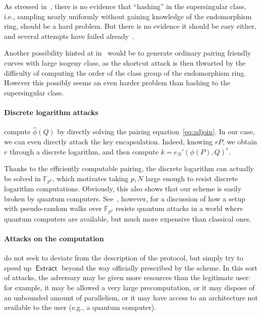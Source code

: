 \documentclass{llncs}
\newcommand{\F}{\mathbb{F}}
\DeclareMathOperator{\Extract}{\mathsf{Extract}}
\begin{document}
As stressed in~\cite{10.1007/978-3-030-34578-5_10}, there is no
evidence that ``hashing'' in the supersingular class, i.e., sampling
nearly uniformly without gaining knowledge of the endomorphism ring,
should be a hard problem. %
But there is no evidence it should be easy either, and several
attempts have failed
already~\cite{10.1007/978-3-030-45724-2_18,love2019supersingular}.

Another possibility hinted at in~\cite{10.1007/978-3-030-34578-5_10}
would be to generate ordinary pairing friendly curves with large
isogeny class, as the shortcut attack is then thwarted by the
difficulty of computing the order of the class group of the
endomorphism ring. %
However this possibly seems an even harder problem than hashing to the
supersingular class.

\paragraph{Discrete logarithm attacks} compute $\hat\phi(Q)$ by
directly solving the pairing equation~\eqref{eq:adjoin}. %
In our case, we can even directly attack the key encapsulation. %
Indeed, knowing $rP$, we obtain $r$ through a discrete logarithm, and
then compute $k=e_N'(\phi(P),Q)^r$.

Thanks to the efficiently computable pairing, the discrete logarithm
can actually be solved in $\F_{p^2}$, which motivates taking $p,N$
large enough to resist discrete logarithm computations. %
Obviously, this also shows that our scheme is easily broken by quantum
computers. %
See~\cite{10.1007/978-3-030-34578-5_10}, however, for a discussion of
how a setup with pseudo-random walks over $\F_{p^2}$ resists quantum
attacks in a world where quantum computers are available, but much
more expensive than classical ones.

\paragraph{Attacks on the computation} do not seek to deviate from the
description of the protocol, but simply try to speed up $\Extract$
beyond the way officially prescribed by the scheme. %
In this sort of attacks, the adversary may be given more resources
than the legitimate user: for example, it may be allowed a very large
precomputation, or it may dispose of an unbounded amount of
parallelism, or it may have access to an architecture not available to
the user (e.g., a quantum computer).
\end{document}

